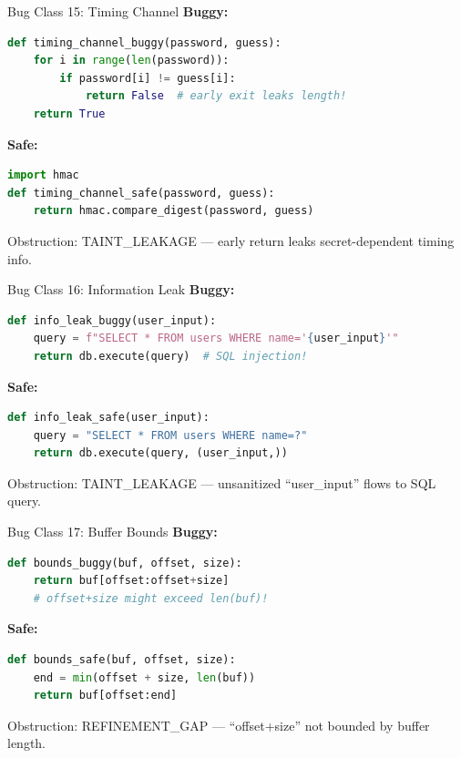 \documentclass[aspectratio=169,10pt]{beamer}
\newcommand{\warn}[1]{\begin{center}
  \colorbox{warnbg}{\parbox{0.88\textwidth}{\centering\small #1}}\end{center}}
\begin{document}
\begin{frame}[fragile]{Bug Class 15: Timing Channel}
\textbf{Buggy:}
\begin{lstlisting}[language=Python, basicstyle=\ttfamily\scriptsize]
def timing_channel_buggy(password, guess):
    for i in range(len(password)):
        if password[i] != guess[i]:
            return False  # early exit leaks length!
    return True
\end{lstlisting}
\textbf{Safe:}
\begin{lstlisting}[language=Python, basicstyle=\ttfamily\scriptsize]
import hmac
def timing_channel_safe(password, guess):
    return hmac.compare_digest(password, guess)
\end{lstlisting}
\warn{Obstruction: TAINT\_LEAKAGE --- early return leaks secret-dependent timing info.}
\end{frame}

\begin{frame}[fragile]{Bug Class 16: Information Leak}
\textbf{Buggy:}
\begin{lstlisting}[language=Python, basicstyle=\ttfamily\scriptsize]
def info_leak_buggy(user_input):
    query = f"SELECT * FROM users WHERE name='{user_input}'"
    return db.execute(query)  # SQL injection!
\end{lstlisting}
\textbf{Safe:}
\begin{lstlisting}[language=Python, basicstyle=\ttfamily\scriptsize]
def info_leak_safe(user_input):
    query = "SELECT * FROM users WHERE name=?"
    return db.execute(query, (user_input,))
\end{lstlisting}
\warn{Obstruction: TAINT\_LEAKAGE --- unsanitized ``user\_input'' flows to SQL query.}
\end{frame}

\begin{frame}[fragile]{Bug Class 17: Buffer Bounds}
\textbf{Buggy:}
\begin{lstlisting}[language=Python, basicstyle=\ttfamily\scriptsize]
def bounds_buggy(buf, offset, size):
    return buf[offset:offset+size]
    # offset+size might exceed len(buf)!
\end{lstlisting}
\textbf{Safe:}
\begin{lstlisting}[language=Python, basicstyle=\ttfamily\scriptsize]
def bounds_safe(buf, offset, size):
    end = min(offset + size, len(buf))
    return buf[offset:end]
\end{lstlisting}
\warn{Obstruction: REFINEMENT\_GAP --- ``offset+size'' not bounded by buffer length.}
\end{frame}
\end{document}
